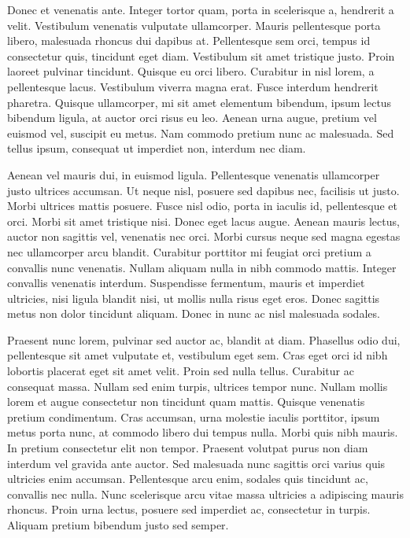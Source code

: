 Donec et venenatis ante.
Integer tortor quam, porta in scelerisque a, hendrerit a velit.
Vestibulum venenatis vulputate ullamcorper.
Mauris pellentesque porta libero, malesuada rhoncus dui dapibus at.
Pellentesque sem orci, tempus id consectetur quis, tincidunt eget diam.
Vestibulum sit amet tristique justo.
Proin laoreet pulvinar tincidunt.
Quisque eu orci libero.
Curabitur in nisl lorem, a pellentesque lacus.
Vestibulum viverra magna erat.
Fusce interdum hendrerit pharetra.
Quisque ullamcorper, mi sit amet elementum bibendum, ipsum lectus bibendum ligula, at auctor orci risus eu leo.
Aenean urna augue, pretium vel euismod vel, suscipit eu metus.
Nam commodo pretium nunc ac malesuada.
Sed tellus ipsum, consequat ut imperdiet non, interdum nec diam.

Aenean vel mauris dui, in euismod ligula.
Pellentesque venenatis ullamcorper justo ultrices accumsan.
Ut neque nisl, posuere sed dapibus nec, facilisis ut justo.
Morbi ultrices mattis posuere.
Fusce nisl odio, porta in iaculis id, pellentesque et orci.
Morbi sit amet tristique nisi.
Donec eget lacus augue.
Aenean mauris lectus, auctor non sagittis vel, venenatis nec orci.
Morbi cursus neque sed magna egestas nec ullamcorper arcu blandit.
Curabitur porttitor mi feugiat orci pretium a convallis nunc venenatis.
Nullam aliquam nulla in nibh commodo mattis.
Integer convallis venenatis interdum.
Suspendisse fermentum, mauris et imperdiet ultricies, nisi ligula blandit nisi, ut mollis nulla risus eget eros.
Donec sagittis metus non dolor tincidunt aliquam.
Donec in nunc ac nisl malesuada sodales.

Praesent nunc lorem, pulvinar sed auctor ac, blandit at diam.
Phasellus odio dui, pellentesque sit amet vulputate et, vestibulum eget sem.
Cras eget orci id nibh lobortis placerat eget sit amet velit.
Proin sed nulla tellus.
Curabitur ac consequat massa.
Nullam sed enim turpis, ultrices tempor nunc.
Nullam mollis lorem et augue consectetur non tincidunt quam mattis.
Quisque venenatis pretium condimentum.
Cras accumsan, urna molestie iaculis porttitor, ipsum metus porta nunc, at commodo libero dui tempus nulla.
Morbi quis nibh mauris.
In pretium consectetur elit non tempor.
Praesent volutpat purus non diam interdum vel gravida ante auctor.
Sed malesuada nunc sagittis orci varius quis ultricies enim accumsan.
Pellentesque arcu enim, sodales quis tincidunt ac, convallis nec nulla.
Nunc scelerisque arcu vitae massa ultricies a adipiscing mauris rhoncus.
Proin urna lectus, posuere sed imperdiet ac, consectetur in turpis.
Aliquam pretium bibendum justo sed semper.

